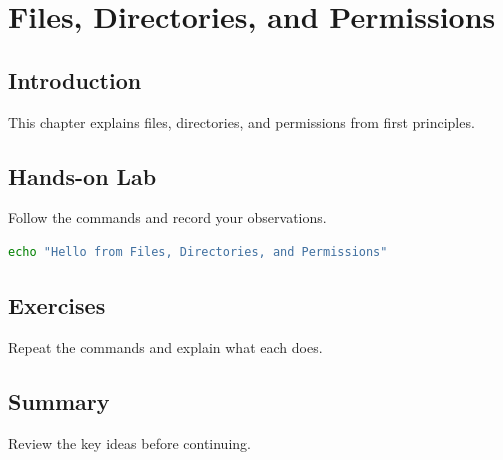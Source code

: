 \chapter{Files, Directories, and Permissions}
\label{vol2chap3}



\section{Introduction}
This chapter explains files, directories, and permissions from first principles.

\section{Hands-on Lab}
Follow the commands and record your observations.

\begin{lstlisting}[language=bash]
echo "Hello from Files, Directories, and Permissions"
\end{lstlisting}

\section{Exercises}
\begin{exercise}
Repeat the commands and explain what each does.
\end{exercise}

\section{Summary}
Review the key ideas before continuing.
